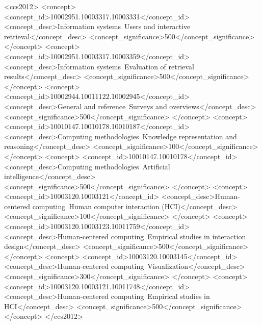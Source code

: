 \begin{CCSXML}
<ccs2012>
   <concept>
       <concept_id>10002951.10003317.10003331</concept_id>
       <concept_desc>Information systems~Users and interactive retrieval</concept_desc>
       <concept_significance>500</concept_significance>
       </concept>
   <concept>
       <concept_id>10002951.10003317.10003359</concept_id>
       <concept_desc>Information systems~Evaluation of retrieval results</concept_desc>
       <concept_significance>500</concept_significance>
       </concept>
   <concept>
       <concept_id>10002944.10011122.10002945</concept_id>
       <concept_desc>General and reference~Surveys and overviews</concept_desc>
       <concept_significance>500</concept_significance>
       </concept>
   <concept>
       <concept_id>10010147.10010178.10010187</concept_id>
       <concept_desc>Computing methodologies~Knowledge representation and reasoning</concept_desc>
       <concept_significance>100</concept_significance>
       </concept>
   <concept>
       <concept_id>10010147.10010178</concept_id>
       <concept_desc>Computing methodologies~Artificial intelligence</concept_desc>
       <concept_significance>500</concept_significance>
       </concept>
   <concept>
       <concept_id>10003120.10003121</concept_id>
       <concept_desc>Human-centered computing~Human computer interaction (HCI)</concept_desc>
       <concept_significance>100</concept_significance>
       </concept>
   <concept>
       <concept_id>10003120.10003123.10011759</concept_id>
       <concept_desc>Human-centered computing~Empirical studies in interaction design</concept_desc>
       <concept_significance>500</concept_significance>
       </concept>
   <concept>
       <concept_id>10003120.10003145</concept_id>
       <concept_desc>Human-centered computing~Visualization</concept_desc>
       <concept_significance>300</concept_significance>
       </concept>
   <concept>
       <concept_id>10003120.10003121.10011748</concept_id>
       <concept_desc>Human-centered computing~Empirical studies in HCI</concept_desc>
       <concept_significance>500</concept_significance>
       </concept>
 </ccs2012>
\end{CCSXML}

